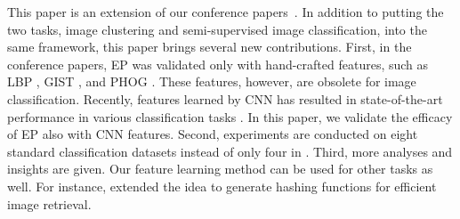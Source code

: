 \documentclass[preprint,12pt,3p]{elsarticle}
\begin{document}
This paper is an extension of our conference papers~\citep{dai:eccv12b,dai:iccv13b}. 
In addition to putting the two tasks, image clustering and semi-supervised image classification, 
into the same framework, this paper brings several new
contributions. First, in the conference papers, EP
was validated only with hand-crafted features, such as LBP
\citep{Ojala02}, GIST \citep{gist}, and PHOG
\citep{Bosch:iccv07}. These features, however, are obsolete for image classification. 
Recently, features learned by CNN has resulted in
state-of-the-art performance in various classification tasks
\citep{nips12:cnn, caffe14, rich:feature:cvpr14, deep:bmvc14}. In this
paper, we validate the efficacy of EP also with CNN features. Second, experiments are 
conducted on eight standard classification
datasets instead of only four in \citep{dai:iccv13b}. Third, 
more analyses and insights are given. 
Our feature learning method can be used for other tasks as well. For instance, 
\citep{random:hashing} extended the idea to generate hashing functions
for efficient image retrieval.
\end{document}
